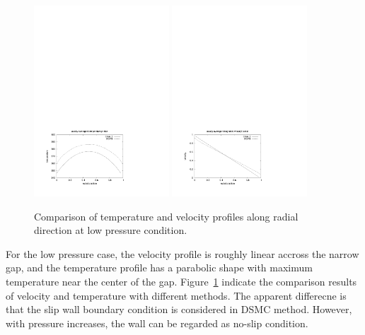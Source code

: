 \begin{figure}[htbp]
\begin{center}
\includegraphics[width=0.45\textwidth,viewport=41 46 411 298,clip=true]{../3D/taylor-couette/temperature-low.pdf}
\includegraphics[width=0.45\textwidth,viewport=41 50 407 303,clip=true]{../3D/taylor-couette/velocity-low.pdf}
\end{center}
\caption{Comparison of temperature and velocity profiles along radial direction at low pressure condition.}
\label{tcl-tv-fig}
\end{figure}

\medskip
For the low pressure case, the velocity profile is roughly linear accross the narrow gap, and the temperature
profile has a parabolic shape with maximum temperature near the center of the gap. Figure~\ref{tcl-tv-fig}
indicate the comparison results of velocity and temperature with different methods.
The apparent differecne is that the slip wall boundary condition is considered in DSMC method. However, with pressure
increases, the wall can be regarded as no-slip condition.

